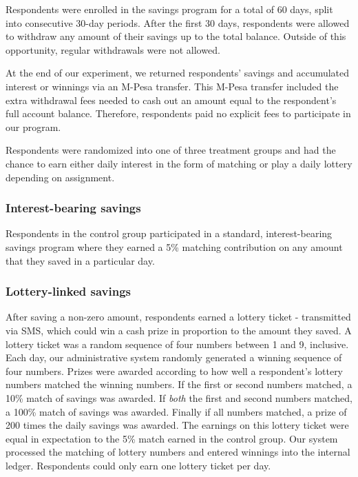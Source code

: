 \documentclass[10pt]{article}
\begin{document}
		Respondents were enrolled in the savings program for a total of 60 days, split into consecutive 30-day periods. After the first 30 days, respondents were allowed to withdraw any amount of their savings up to the total balance. Outside of this opportunity, regular withdrawals were not allowed.

		At the end of our experiment, we returned respondents’ savings and accumulated interest or winnings via an M-Pesa transfer. This M-Pesa transfer included the extra withdrawal fees needed to cash out an amount equal to the respondent’s full account balance. Therefore, respondents paid no explicit fees to participate in our program.

		Respondents were randomized into one of three treatment groups and had the chance to earn either daily interest in the form of matching or play a daily lottery depending on assignment.

		\subsubsection{Interest-bearing savings}

			Respondents in the control group participated in a standard, interest-bearing savings program where they earned a 5\% matching contribution on any amount that they saved in a particular day.

		\subsubsection{Lottery-linked savings}

			After saving a non-zero amount, respondents earned a lottery ticket - transmitted via SMS, which could win a cash prize in proportion to the amount they saved. A lottery ticket was a random sequence of four numbers between 1 and 9, inclusive. Each day, our administrative system randomly generated a winning sequence of four numbers. Prizes were awarded according to how well a respondent’s lottery numbers matched the winning numbers. If the first or second numbers matched, a 10\% match of savings was awarded. If \emph{both} the first and second numbers matched, a 100\% match of savings was awarded. Finally if all numbers matched, a prize of 200 times the daily savings was awarded. The earnings on this lottery ticket were equal in expectation to the 5\% match earned in the control group. Our system processed the matching of lottery numbers and entered winnings into the internal ledger. Respondents could only earn one lottery ticket per day.
\end{document}
